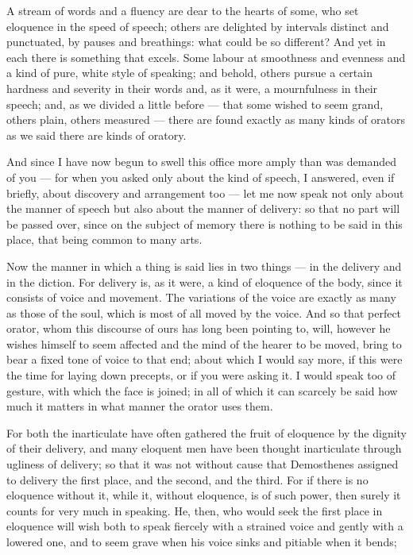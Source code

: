  A stream of words and a fluency are dear to the hearts of some, who set eloquence in the speed of speech; others are delighted by intervals distinct and punctuated, by pauses and breathings: what could be so different? And yet in each there is something that excels. Some labour at smoothness and evenness and a kind of pure, white style of speaking; and behold, others pursue a certain hardness and severity in their words and, as it were, a mournfulness in their speech; and, as we divided a little before — that some wished to seem grand, others plain, others measured — there are found exactly as many kinds of orators as we said there are kinds of oratory.

 And since I have now begun to swell this office more amply than was demanded of you — for when you asked only about the kind of speech, I answered, even if briefly, about discovery and arrangement too — let me now speak not only about the manner of speech but also about the manner of delivery: so that no part will be passed over, since on the subject of memory there is nothing to be said in this place, that being common to many arts.

 Now the manner in which a thing is said lies in two things — in the delivery and in the diction. For delivery is, as it were, a kind of eloquence of the body, since it consists of voice and movement. The variations of the voice are exactly as many as those of the soul, which is most of all moved by the voice. And so that perfect orator, whom this discourse of ours has long been pointing to, will, however he wishes himself to seem affected and the mind of the hearer to be moved, bring to bear a fixed tone of voice to that end; about which I would say more, if this were the time for laying down precepts, or if you were asking it. I would speak too of gesture, with which the face is joined; in all of which it can scarcely be said how much it matters in what manner the orator uses them.

 For both the inarticulate have often gathered the fruit of eloquence by the dignity of their delivery, and many eloquent men have been thought inarticulate through ugliness of delivery; so that it was not without cause that Demosthenes assigned to delivery the first place, and the second, and the third. For if there is no eloquence without it, while it, without eloquence, is of such power, then surely it counts for very much in speaking. He, then, who would seek the first place in eloquence will wish both to speak fiercely with a strained voice and gently with a lowered one, and to seem grave when his voice sinks and pitiable when it bends;

